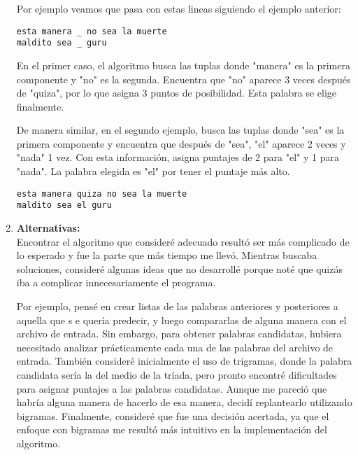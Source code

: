 \documentclass{article}
\begin{document}
\begin{enumerate}
    Por ejemplo veamos que pasa con estas lineas siguiendo el ejemplo anterior:
    \begin{verbatim}
esta manera _ no sea la muerte
maldito sea _ guru
    \end{verbatim}
    En el primer caso, el algoritmo busca las tuplas donde "manera" es la primera componente y "no"
     es la segunda. Encuentra que "no" aparece 3 veces después de "quiza", por lo
      que asigna 3 puntos de posibilidad. Esta palabra se elige finalmente.
      
      De manera similar, en el segundo ejemplo, busca las tuplas donde "sea" es la primera componente
       y encuentra que después de "sea", "el" aparece 2 veces y "nada" 1 vez. Con esta información, asigna
        puntajes de 2 para "el" y 1 para "nada". La palabra elegida es "el" por tener el puntaje más alto.


    \begin{verbatim}
esta manera quiza no sea la muerte
maldito sea el guru
    \end{verbatim}

    \item \textbf{Alternativas:} \\
    Encontrar el algoritmo que consideré adecuado resultó ser más complicado de lo esperado y fue la parte que más
     tiempo me llevó. Mientras buscaba soluciones, consideré algunas ideas que no desarrollé porque
     noté que quizás iba a complicar innecesariamente el programa.

    Por ejemplo, pensé en crear listas de las palabras anteriores y posteriores a aquella que s
    e quería predecir, y luego compararlas de 
    alguna manera con el archivo de entrada. Sin embargo, para obtener palabras candidatas, hubiera necesitado 
    analizar prácticamente cada una de las palabras del archivo de entrada. También consideré inicialmente el 
    uso de trigramas, donde la palabra candidata sería la del medio de la tríada, pero pronto encontré 
    dificultades para asignar puntajes a las palabras candidatas. Aunque me pareció que habría
    alguna manera de hacerlo de esa manera, decidí replantearlo utilizando bigramas.
    Finalmente, consideré que fue una decisión acertada, ya que el 
    enfoque con bigramas me resultó más intuitivo en la implementación del algoritmo.
\end{enumerate}
\end{document}

